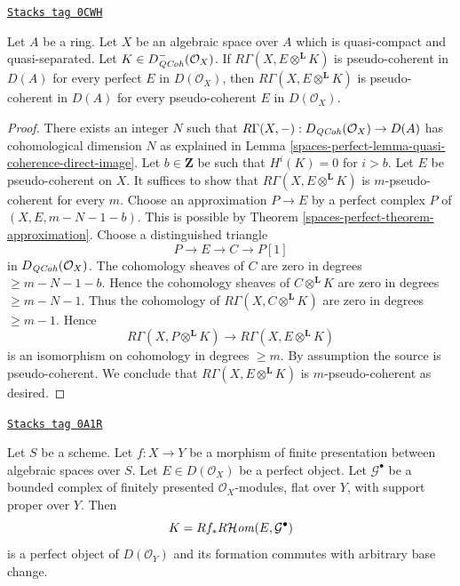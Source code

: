 \begin{lemma}
\label{spaces-perfect-lemma-perfect-enough}
\href{https://stacks.math.columbia.edu/tag/0CWH}{\texttt{Stacks tag 0CWH}}

Let $A$ be a ring. Let $X$ be an algebraic space over $A$ which is
quasi-compact and quasi-separated. Let $K \in D^-_{\mathit{QCoh}}(\mathcal{O}_X)$.
If $R\Gamma(X, E \otimes^\mathbf{L} K)$ is pseudo-coherent
in $D(A)$ for every perfect $E$ in $D(\mathcal{O}_X)$,
then $R\Gamma(X, E \otimes^\mathbf{L} K)$ is pseudo-coherent
in $D(A)$ for every pseudo-coherent $E$ in $D(\mathcal{O}_X)$.
\end{lemma}

\begin{proof}
There exists an integer $N$ such that
$R\Gamma(X, -) : D_{\mathit{QCoh}}(\mathcal{O}_X) \to D(A)$
has cohomological dimension $N$ as explained in
Lemma \ref{spaces-perfect-lemma-quasi-coherence-direct-image}.
Let $b \in \mathbf{Z}$ be such that $H^i(K) = 0$ for $i > b$.
Let $E$ be pseudo-coherent on $X$.
It suffices to show that $R\Gamma(X, E \otimes^\mathbf{L} K)$
is $m$-pseudo-coherent for every $m$.
Choose an approximation $P \to E$ by a perfect complex $P$
of $(X, E, m - N - 1 - b)$. This is possible by
Theorem \ref{spaces-perfect-theorem-approximation}.
Choose a distinguished triangle
$$
P \to E \to C \to P[1]
$$
in $D_{\mathit{QCoh}}(\mathcal{O}_X)$. The cohomology sheaves of $C$ are zero
in degrees $\geq m - N - 1 - b$. Hence the cohomology
sheaves of $C \otimes^\mathbf{L} K$ are zero in degrees $\geq m - N - 1$.
Thus the cohomology of $R\Gamma(X, C \otimes^\mathbf{L} K)$
are zero in degrees $\geq m - 1$. Hence
$$
R\Gamma(X, P \otimes^\mathbf{L} K) \to R\Gamma(X, E \otimes^\mathbf{L} K)
$$
is an isomorphism on cohomology in degrees $\geq m$.
By assumption the source is pseudo-coherent.
We conclude that $R\Gamma(X, E \otimes^\mathbf{L} K)$
is $m$-pseudo-coherent as desired.
\end{proof}

\begin{lemma}
\label{spaces-perfect-lemma-base-change-RHom-perfect}
\href{https://stacks.math.columbia.edu/tag/0A1R}{\texttt{Stacks tag 0A1R}}

Let $S$ be a scheme.
Let $f : X \to Y$ be a morphism of finite presentation
between algebraic spaces over $S$.
Let $E \in D(\mathcal{O}_X)$ be a perfect object. Let $\mathcal{G}^\bullet$
be a bounded complex of finitely presented $\mathcal{O}_X$-modules,
flat over $Y$, with support proper over $Y$. Then
$$
K = Rf_*R\mathcal{H}\mathit{om}(E, \mathcal{G}^\bullet)
$$
is a perfect object of $D(\mathcal{O}_Y)$ and its formation
commutes with arbitrary base change.
\end{lemma}

